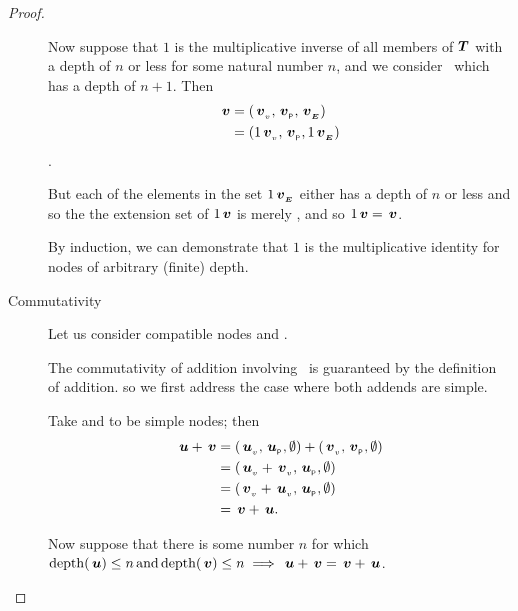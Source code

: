 \begin{proposition}
\begin{proof}
\begin{description}
      Now suppose that \(1\) is the multiplicative inverse of all
      members of $\boldsymbol{T}$ with a depth of \(n\) or less for some natural
      number \(n\), and we consider \ which has a depth of
      \(n+1\). Then
      \begin{align*}
          \,\boldsymbol{v} &= ({\,\boldsymbol{v}}_{{}_{v}}, {\,\boldsymbol{v}}_{{}_{\mathsf{P}}}, {\,\boldsymbol{v}}_{{}_{\boldsymbol{E}}}) \\
          &=  (1 {\,\boldsymbol{v}}_{{}_{v}}, {\,\boldsymbol{v}}_{{}_{\mathsf{P}}}, 1{\,\boldsymbol{v}}_{{}_{\boldsymbol{E}}})
      \end{align*}.

      But each of the elements in the set \(1{\,\boldsymbol{v}}_{{}_{\boldsymbol{E}}}\) either has a
      depth of \(n\) or less and so the the extension set of \(1 \,\boldsymbol{v}\)
      is merely , and so \(1 \,\boldsymbol{v} = \,\boldsymbol{v}\).

      By induction, we can demonstrate that \(1\) is the multiplicative
      identity for nodes of arbitrary (finite) depth.



    \item[Commutativity]

      Let us consider compatible nodes  and .

      The commutativity of addition involving \tzerotree\ is
      guaranteed by the definition of addition. so we first address
      the case where both addends are simple.

      Take  and  to be simple nodes; then
      \begin{align*}
          \,\boldsymbol{u} + \,\boldsymbol{v} &= ({\,\boldsymbol{u}}_{{}_{v}}, {\,\boldsymbol{u}}_{{}_{\mathsf{P}}}, \emptyset) + ({\,\boldsymbol{v}}_{{}_{v}}, {\,\boldsymbol{v}}_{{}_{\mathsf{P}}}, \emptyset) \notag\\
          &= ({\,\boldsymbol{u}}_{{}_{v}} + {\,\boldsymbol{v}}_{{}_{v}}, {\,\boldsymbol{u}}_{{}_{\mathsf{P}}}, \emptyset) \notag\\
          &= ({\,\boldsymbol{v}}_{{}_{v}} + {\,\boldsymbol{u}}_{{}_{v}}, {\,\boldsymbol{u}}_{{}_{\mathsf{P}}}, \emptyset) \notag\\
          &= \,\boldsymbol{v} + \,\boldsymbol{u}.
      \end{align*}

      Now suppose that there is some number \(n\) for which
      \(\operatorname{depth}(\,\boldsymbol{u}) \leq n \operatorname{\text{and}} \operatorname{depth}(\,\boldsymbol{v}) \leq n
      \implies \,\boldsymbol{u} + \,\boldsymbol{v} = \,\boldsymbol{v} + \,\boldsymbol{u}\).


\end{description}
\end{proof}
\end{proposition}
